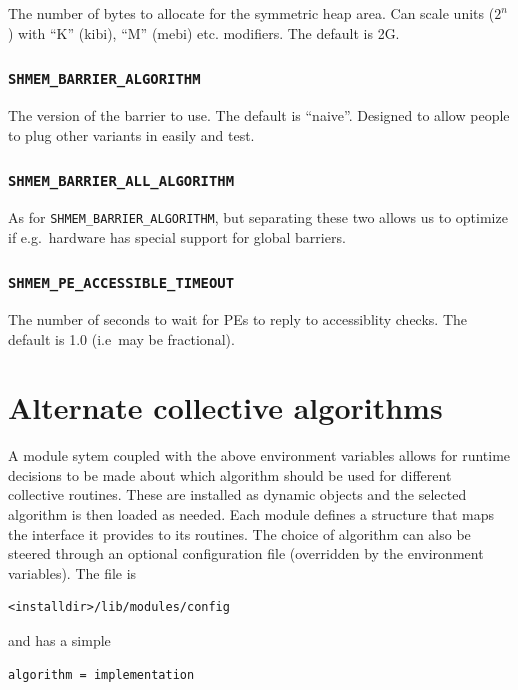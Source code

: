 \documentclass[english]{article}
\begin{document}
The number of bytes to allocate for the symmetric heap area. Can scale
units ($2^n$) with ``K'' (kibi), ``M'' (mebi) etc. modifiers. The default is 2G.

\subsubsection*{\texttt{SHMEM\_BARRIER\_ALGORITHM}}

The version of the barrier to use. The default is ``naive''. Designed
to allow people to plug other variants in easily and test.

\subsubsection*{\texttt{SHMEM\_BARRIER\_ALL\_ALGORITHM}}

As for \texttt{SHMEM\_BARRIER\_ALGORITHM}, but separating these two
allows us to optimize if e.g.\ hardware has special support for global
barriers.

\subsubsection*{\texttt{SHMEM\_PE\_ACCESSIBLE\_TIMEOUT}}

The number of seconds to wait for PEs to reply to accessiblity
checks. The default is 1.0 (i.e\ may be fractional).

\section{Alternate collective algorithms}

A module sytem coupled with the above environment variables allows for
runtime decisions to be made about which algorithm should be used for
different collective routines. These are installed as dynamic objects
and the selected algorithm is then loaded as needed. Each module
defines a structure that maps the interface it provides to its
routines. The choice of algorithm can also be steered through an
optional configuration file (overridden by the environment variables).
The file is

\begin{lstlisting}
<installdir>/lib/modules/config
\end{lstlisting}

and has a simple

\begin{lstlisting}
algorithm = implementation
\end{lstlisting}
\end{document}
